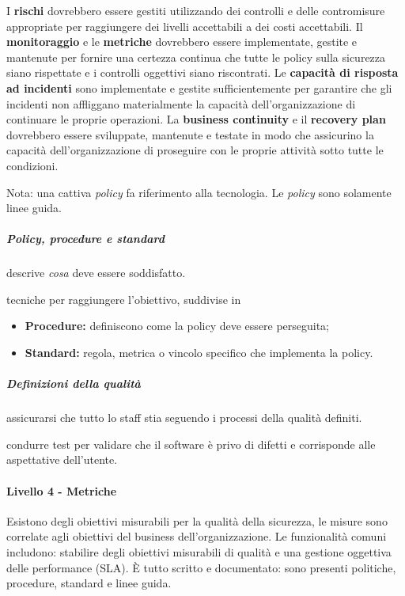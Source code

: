 I \textbf{rischi} dovrebbero essere gestiti utilizzando dei controlli e delle
contromisure appropriate per raggiungere dei livelli accettabili a dei costi
accettabili. Il \textbf{monitoraggio} e le \textbf{metriche} dovrebbero essere
implementate, gestite e mantenute per fornire una certezza continua che tutte
le policy sulla sicurezza siano rispettate e i controlli oggettivi siano
riscontrati. Le \textbf{capacità di risposta ad incidenti} sono implementate e
gestite sufficientemente per garantire che gli incidenti non affliggano materialmente
la capacità dell'organizzazione di continuare le proprie operazioni.
La \textbf{business continuity} e il \textbf{recovery plan} dovrebbero essere
sviluppate, mantenute e testate in modo che assicurino la capacità dell'organizzazione
di proseguire con le proprie attività sotto tutte le condizioni.

Nota: una cattiva \textit{policy} fa riferimento alla tecnologia. Le
\textit{policy} sono solamente linee guida.

\subparagraph{Policy, procedure e standard}

 descrive \textit{cosa} deve essere soddisfatto.

 tecniche per raggiungere l'obiettivo, suddivise in
\begin{itemize}
\item \textbf{Procedure:} definiscono come la policy deve essere perseguita;
\item \textbf{Standard:} regola, metrica o vincolo specifico che implementa la policy.
\end{itemize}

\subparagraph{Definizioni della qualità}

 assicurarsi che tutto lo staff stia seguendo i
processi della qualità definiti.

 condurre test per validare che il software è
privo di difetti e corrisponde alle aspettative dell'utente.

\paragraph{Livello 4 - Metriche}

Esistono degli obiettivi misurabili per la qualità della sicurezza, le misure
sono correlate agli obiettivi del business dell'organizzazione. Le funzionalità
comuni includono: stabilire degli obiettivi misurabili di qualità e una gestione
oggettiva delle performance (SLA).
È tutto scritto e documentato: sono presenti politiche,
procedure, standard e linee guida.

